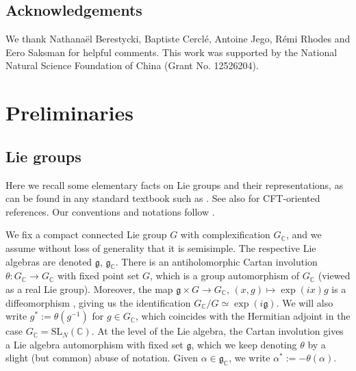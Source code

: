 \documentclass[12pt,a4paper]{amsart}
\numberwithin{equation}{section}
\theoremstyle{remark}
\theoremstyle{definition}
\newcommand{\kg}{\mathfrak g}
\newcommand{\C}{\mathbb C}
\begin{document}

\subsection*{Acknowledgements} We thank Nathana\"el Berestycki, Baptiste Cercl\'e, Antoine Jego, R\'emi Rhodes and Eero Saksman for helpful comments. This work was supported by the National Natural Science Foundation of China (Grant No. 12526204).

  
   \section{Preliminaries}\label{sec:preliminaries}

    \subsection{Lie groups}\label{subsubsec:lie-groups}
Here we recall some elementary facts on Lie groups and their representations, as can be found in any standard textbook such as \cite{Knapp}. See also \cite{EFK_KZ-lectures,dFMS_CFT-book} for CFT-oriented references. Our conventions and notations follow \cite[Section~2.1]{Bav26}.
    
We fix a compact connected Lie group $G$ with complexification $G_\C$, and we assume without loss of generality that it is semisimple. The respective Lie algebras are denoted $\kg$, $\kg_\C$. There is an antiholomorphic Cartan involution $\theta:G_\C\to G_\C$ with fixed point set $G$, which is a group automorphism of $G_\C$ (viewed as a real Lie group). 
Moreover, the map $\kg\times G\to G_\C,\,(x,g)\mapsto\exp(ix)g$ is a diffeomorphism \cite[Theorem 6.31]{Knapp}, giving us the identification $G_\C/G\simeq\exp(i\kg)$. We will also write $g^*:=\theta(g^{-1})$ for $g\in G_\C$, which coincides with the Hermitian adjoint in the case $G_\C=\mathrm{SL}_N(\C)$. At the level of the Lie algebra, the Cartan involution gives a Lie algebra automorphism with fixed set $\kg$, which we keep denoting $\theta$ by a slight (but common) abuse of notation. Given $\alpha\in\kg_\C$, we write $\alpha^*:=-\theta(\alpha)$.
\end{document}
